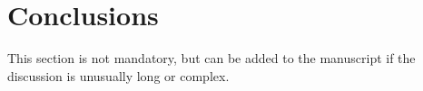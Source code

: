 \section{Conclusions}

This section is not mandatory, but can be added to the manuscript if the discussion is unusually long or complex.